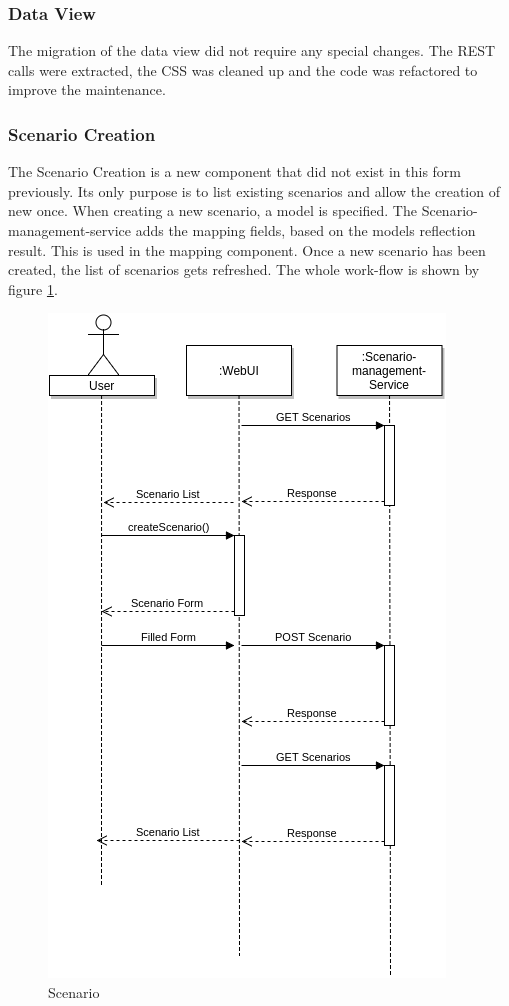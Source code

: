 \subsubsection{Data View}
The migration of the data view did not require any special changes. The REST calls were extracted, the CSS was cleaned up and the code was refactored to improve the maintenance.

\subsubsection{Scenario Creation}
The Scenario Creation is a new component that did not exist in this form previously. Its only purpose is to list existing scenarios and allow the creation of new once. When creating a new scenario, a model is specified. The Scenario-management-service adds the mapping fields, based on the models reflection result. This is used in the mapping component. Once a new scenario has been created, the list of scenarios gets refreshed. The whole work-flow is shown by figure \ref{fig:scenario}.
\begin{figure}[H]
	\centering\includegraphics[width=.65\textwidth]{res/Scenario}
	\caption{Scenario}
	\label{fig:scenario}
\end{figure}

